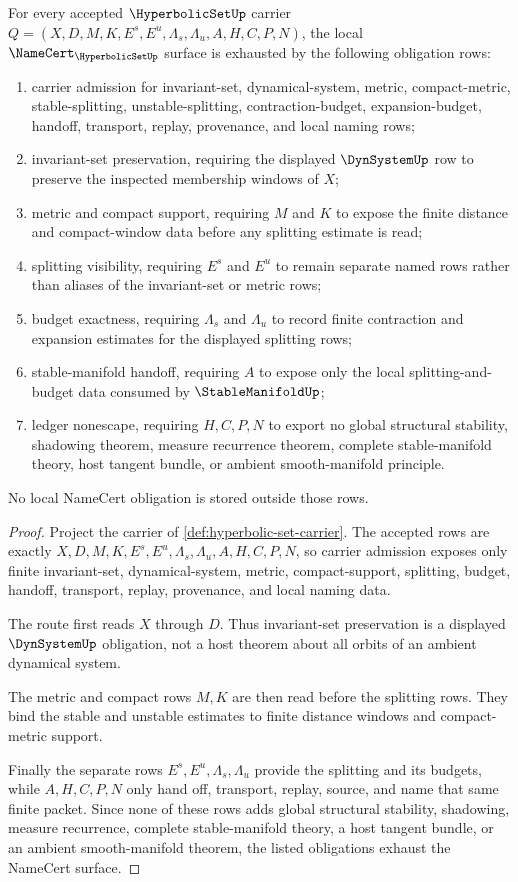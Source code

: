 \begin{theorem}
\label{thm:hyperbolic-set-namecert-obligations}
For every accepted $\HyperbolicSetUp$ carrier
$Q=(X,D,M,K,E^s,E^u,\Lambda_s,\Lambda_u,A,H,C,P,N)$, the local
$\NameCert_{\HyperbolicSetUp}$ surface is exhausted by the following
obligation rows:
\begin{enumerate}
\item carrier admission for invariant-set, dynamical-system, metric,
compact-metric, stable-splitting, unstable-splitting, contraction-budget,
expansion-budget, handoff, transport, replay, provenance, and local naming
rows;
\item invariant-set preservation, requiring the displayed $\DynSystemUp$ row
to preserve the inspected membership windows of $X$;
\item metric and compact support, requiring $M$ and $K$ to expose the finite
distance and compact-window data before any splitting estimate is read;
\item splitting visibility, requiring $E^s$ and $E^u$ to remain separate named
rows rather than aliases of the invariant-set or metric rows;
\item budget exactness, requiring $\Lambda_s$ and $\Lambda_u$ to record finite
contraction and expansion estimates for the displayed splitting rows;
\item stable-manifold handoff, requiring $A$ to expose only the local
splitting-and-budget data consumed by $\StableManifoldUp$;
\item ledger nonescape, requiring $H,C,P,N$ to export no global structural
stability, shadowing theorem, measure recurrence theorem, complete
stable-manifold theory, host tangent bundle, or ambient smooth-manifold
principle.
\end{enumerate}
No local NameCert obligation is stored outside those rows.
\end{theorem}
\begin{proof}
Project the carrier of \autoref{def:hyperbolic-set-carrier}. The accepted
rows are exactly $X,D,M,K,E^s,E^u,\Lambda_s,\Lambda_u,A,H,C,P,N$, so carrier
admission exposes only finite invariant-set, dynamical-system, metric,
compact-support, splitting, budget, handoff, transport, replay, provenance,
and local naming data.

The route first reads $X$ through $D$. Thus invariant-set preservation is a
displayed $\DynSystemUp$ obligation, not a host theorem about all orbits of an
ambient dynamical system.

The metric and compact rows $M,K$ are then read before the splitting rows.
They bind the stable and unstable estimates to finite distance windows and
compact-metric support.

Finally the separate rows $E^s,E^u,\Lambda_s,\Lambda_u$ provide the splitting
and its budgets, while $A,H,C,P,N$ only hand off, transport, replay, source,
and name that same finite packet. Since none of these rows adds global
structural stability, shadowing, measure recurrence, complete stable-manifold
theory, a host tangent bundle, or an ambient smooth-manifold theorem, the
listed obligations exhaust the NameCert surface.
\end{proof}

